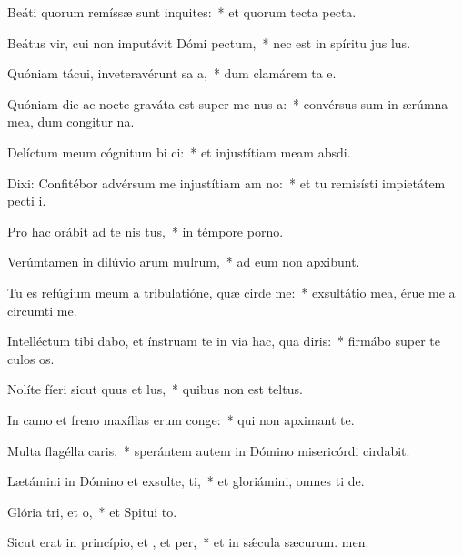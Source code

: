 \item Beáti quorum remíssæ sunt inquites:~* et quorum tecta  pecta.
\item Beátus vir, cui non imputávit Dómi pectum,~* nec est in spíritu jus lus.
\item Quóniam tácui, inveteravérunt sa a,~* dum clamárem ta e.
\item Quóniam die ac nocte graváta est super me nus a:~* convérsus sum in ærúmna mea, dum congitur na.
\item Delíctum meum cógnitum bi ci:~* et injustítiam meam  absdi.
\item Dixi: Confitébor advérsum me injustítiam am no:~* et tu remisísti impietátem pecti i.
\item Pro hac orábit ad te nis tus,~* in témpore porno.
\item Verúmtamen in dilúvio arum mulrum,~* ad eum non apxibunt.
\item Tu es refúgium meum a tribulatióne, quæ cirde me:~* exsultátio mea, érue me a circumti me.
\item Intelléctum tibi dabo, et ínstruam te in via hac, qua diris:~* firmábo super te culos os.
\item Nolíte fíeri sicut quus et lus,~* quibus non est teltus.
\item In camo et freno maxíllas erum conge:~* qui non apximant  te.
\item Multa flagélla caris,~* sperántem autem in Dómino misericórdi cirdabit.
\item Lætámini in Dómino et exsulte, ti,~* et gloriámini, omnes ti de.
\item Glória tri, et o,~* et Spitui to.
\item Sicut erat in princípio, et , et per,~* et in sǽcula sæcurum. men.
